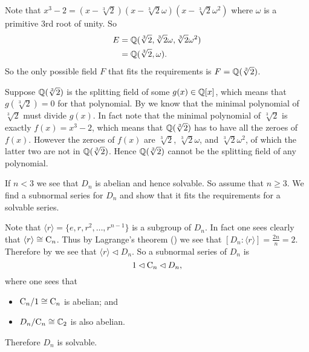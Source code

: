 \begin{questions}
    \item \begin{partquestions}{\roman*}
        \item Note that $x^3 - 2 = (x-\sqrt[3]2)(x-\sqrt[3]2\omega)(x-\sqrt[3]2\omega^2)$ where $\omega$ is a primitive 3rd root of unity. So
        \begin{align*}
            E &= \mathbb{Q}(\sqrt[3]2, \sqrt[3]2\omega, \sqrt[3]2\omega^2)\\
            &= \mathbb{Q}(\sqrt[3]2,\omega).
        \end{align*}
        So the only possible field $F$ that fits the requirements is $F = \mathbb{Q}(\sqrt[3]2)$.

        \item Suppose $\mathbb{Q}(\sqrt[3]2)$ is the splitting field of some $g(x) \in \mathbb{Q}[x]$, which means that $g(\sqrt[3]2) = 0$ for that polynomial. By  we know that the minimal polynomial of $\sqrt[3]2$ must divide $g(x)$. In fact note that the minimal polynomial of $\sqrt[3]2$ is exactly $f(x) = x^3 - 2$, which means that $\mathbb{Q}(\sqrt[3]2)$ has to have all the zeroes of $f(x)$. However the zeroes of $f(x)$ are $\sqrt[3]2$, $\sqrt[3]2\omega$, and $\sqrt[3]2\omega^2$, of which the latter two are not in $\mathbb{Q}(\sqrt[3]2)$. Hence $\mathbb{Q}(\sqrt[3]2)$ cannot be the splitting field of any polynomial.
    \end{partquestions}

    \item If $n < 3$ we see that $D_n$ is abelian and hence solvable. So assume that $n \geq 3$. We find a subnormal series for $D_n$ and show that it fits the requirements for a solvable series.

    Note that $\langle r \rangle = \{e, r, r^2, \dots, r^{n-1}\}$ is a subgroup of $D_n$. In fact one sees clearly that $\langle r \rangle \cong \mathrm{C}_{n}$. Thus by Lagrange's theorem () we see that $[D_n:\langle r \rangle] = \frac{2n}{n} = 2$. Therefore by  we see that $\langle r \rangle \lhd D_n$. So a subnormal series of $D_n$ is
    \[
        1 \lhd \mathrm{C}_{n} \lhd D_n,
    \]
    where one sees that
    \begin{itemize}
        \item $\mathrm{C}_{n}/1 \cong \mathrm{C}_{n}$ is abelian; and
        \item $D_n/\mathrm{C}_{n} \cong \mathbb{C}_2$ is also abelian.
    \end{itemize}
    Therefore $D_n$ is solvable.


\end{questions}
